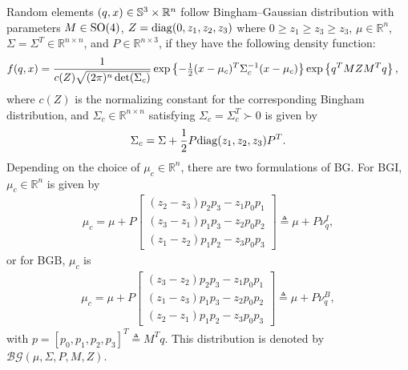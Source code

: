 \begin{definition}
	Random elements $(q,x)\in\mathbb{S}^3\times\mathbb{R}^n$ follow Bingham--Gaussian distribution with parameters $M\in\mathrm{SO}(4)$, $Z = \mathrm{diag}(0,z_1,z_2,z_3)$ where $0\geq z_1 \geq z_3 \geq z_3$, $\mu\in\mathbb{R}^n$, $\Sigma=\Sigma^T\in\mathbb{R}^{n\times n}$, and $P\in\mathbb{R}^{n\times 3}$, if they have the following density function:
	\begin{align} \label{eqn:BG-density}
		&f(q,x) = \frac{1}{c(Z)\sqrt{(2\pi)^n\det(\Sigma_c)}} \exp\left\{  -\tfrac{1}{2}(x-\mu_c)^T \Sigma_c^{-1} (x-\mu_c)  \right\} \exp\left\{ q^TMZM^Tq \right\} ,
	\end{align}
	where $c(Z)$ is the normalizing constant for the corresponding Bingham distribution, and $\Sigma_c\in\mathbb{R}^{n\times n}$ satisfying $\Sigma_c = \Sigma_c^T \succ 0$ is given by
	\begin{align}
		\Sigma_c = \Sigma + \frac{1}{2}P\mathrm{diag}(z_1,z_2,z_3)P^T.
	\end{align}
	Depending on the choice of $\mu_c\in\mathbb{R}^n$, there are two formulations of BG. 
	For BGI, $\mu_c\in\mathbb{R}^n$ is given by
	\begin{align} \label{eqn:BG-vq-BGI}
		\mu_c = \mu + P\begin{bmatrix} (z_2-z_3)p_2p_3 - z_1p_0p_1 \\ (z_3-z_1)p_1p_3 - z_2p_0p_2 \\ (z_1-z_2)p_1p_2 - z_3p_0p_3 \end{bmatrix} \triangleq \mu + P\nu_q^I,
	\end{align}
	or for BGB, $\mu_c$ is
	\begin{align} \label{eqn:BG-vq-BGB}
		\mu_c = \mu + P\begin{bmatrix} (z_3-z_2)p_2p_3 - z_1p_0p_1 \\ (z_1-z_3)p_1p_3 - z_2p_0p_2 \\ (z_2-z_1)p_1p_2 - z_3p_0p_3 \end{bmatrix} \triangleq \mu + P\nu_q^B,
	\end{align}
	with $p = [p_0, p_1, p_2, p_3]^T \triangleq M^Tq$.
	This distribution is denoted by $\mathcal{BG}(\mu,\Sigma,P,M,Z)$.
\end{definition}

